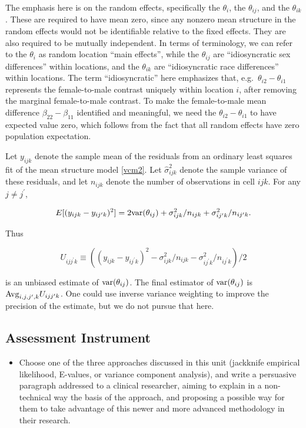The emphasis here is on the random effects, specifically the $\theta_i$, the $\theta_{ij}$, and the $\theta_{ik}$. These are required to have mean zero, since any nonzero mean structure in the random effects would not be identifiable relative to the fixed effects. They are also required to be mutually independent. In terms of terminology, we can refer to the $\theta_i$ as random location ``main effects'', while the $\theta_{ij}$ are ``idiosyncratic sex differences'' within locations, and the $\theta_{ik}$ are ``idiosyncratic race differences'' within locations. The term ``idiosyncratic'' here emphasizes that, e.g.\ $\theta_{i2} - \theta_{i1}$ represents the female-to-male contrast uniquely within location $i$, after removing the marginal female-to-male contrast. To make the female-to-male mean difference $\beta_{22} - \beta_{11}$ identified and meaningful, we need the $\theta_{i2} - \theta_{i1}$ to have expected value zero, which follows from the fact that all random effects have zero population expectation.

Let $y_{ijk}$ denote the sample mean of the residuals from an ordinary least squares fit of the mean structure model \ref{vcm2}. Let $\hat{\sigma}_{ijk}^2$ denote the sample variance of these residuals, and let $n_{ijk}$ denote the number of observations in cell $ijk$. For any $j \neq j^\prime$,

\begin{equation}
E[(y_{ijk} - y_{ij^\prime k})^2] = 2{\rm var}(\theta_{ij}) + \sigma_{ijk}^2/n_{ijk} + \sigma_{ij^\prime k}^2/n_{ij^\prime k}.
\end{equation}

\noindent Thus

$$
U_{ijj^\prime k} \equiv ((y_{ijk} - y_{ij^\prime k})^2 - \sigma_{ijk}^2/n_{ijk} - \sigma_{ij^\prime k}^2/n_{ij^\prime k})/2
$$

\noindent is an unbiased estimate of ${\rm var}(\theta_{ij})$. The final estimator of ${\rm var}(\theta_{ij})$ is ${\rm Avg}_{i,j,j^\prime, k} U_{ijj^\prime k}$. One could use inverse variance weighting to improve the precision of the estimate, but we do not pursue that here.

\subsection{Assessment Instrument}

\begin{itemize}
    \item Choose one of the three approaches discussed in this unit (jackknife empirical likelihood, E-values, or variance component analysis), and write a persuasive paragraph addressed to a clinical researcher, aiming to explain in a non-technical way the basis of the approach, and proposing a possible way for them to take advantage of this newer and more advanced methodology in their research.
\end{itemize}

